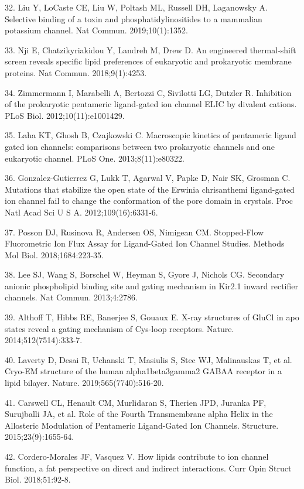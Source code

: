 32. Liu Y, LoCaste CE, Liu W, Poltash ML, Russell DH, Laganowsky A.
Selective binding of a toxin and phosphatidylinositides to a mammalian
potassium channel. Nat Commun. 2019;10(1):1352.

33. Nji E, Chatzikyriakidou Y, Landreh M, Drew D. An engineered
thermal-shift screen reveals specific lipid preferences of eukaryotic
and prokaryotic membrane proteins. Nat Commun. 2018;9(1):4253.

34. Zimmermann I, Marabelli A, Bertozzi C, Sivilotti LG, Dutzler R.
Inhibition of the prokaryotic pentameric ligand-gated ion channel ELIC
by divalent cations. PLoS Biol. 2012;10(11):e1001429.

35. Laha KT, Ghosh B, Czajkowski C. Macroscopic kinetics of pentameric
ligand gated ion channels: comparisons between two prokaryotic channels
and one eukaryotic channel. PLoS One. 2013;8(11):e80322.

36. Gonzalez-Gutierrez G, Lukk T, Agarwal V, Papke D, Nair SK, Grosman
C. Mutations that stabilize the open state of the Erwinia chrisanthemi
ligand-gated ion channel fail to change the conformation of the pore
domain in crystals. Proc Natl Acad Sci U S A. 2012;109(16):6331-6.

37. Posson DJ, Rusinova R, Andersen OS, Nimigean CM. Stopped-Flow
Fluorometric Ion Flux Assay for Ligand-Gated Ion Channel Studies.
Methods Mol Biol. 2018;1684:223-35.

38. Lee SJ, Wang S, Borschel W, Heyman S, Gyore J, Nichols CG. Secondary
anionic phospholipid binding site and gating mechanism in Kir2.1 inward
rectifier channels. Nat Commun. 2013;4:2786.

39. Althoff T, Hibbs RE, Banerjee S, Gouaux E. X-ray structures of GluCl
in apo states reveal a gating mechanism of Cys-loop receptors. Nature.
2014;512(7514):333-7.

40. Laverty D, Desai R, Uchanski T, Masiulis S, Stec WJ, Malinauskas T,
et al. Cryo-EM structure of the human alpha1beta3gamma2 GABAA receptor
in a lipid bilayer. Nature. 2019;565(7740):516-20.

41. Carswell CL, Henault CM, Murlidaran S, Therien JPD, Juranka PF,
Surujballi JA, et al. Role of the Fourth Transmembrane alpha Helix in
the Allosteric Modulation of Pentameric Ligand-Gated Ion Channels.
Structure. 2015;23(9):1655-64.

42. Cordero-Morales JF, Vasquez V. How lipids contribute to ion channel
function, a fat perspective on direct and indirect interactions. Curr
Opin Struct Biol. 2018;51:92-8.

